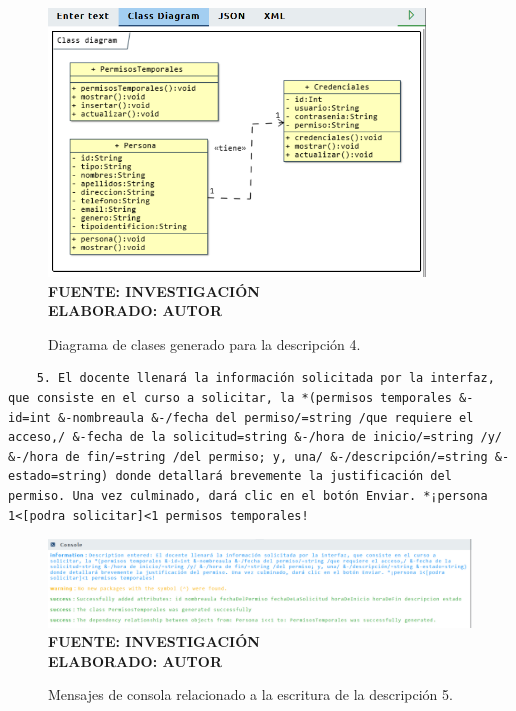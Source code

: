  \begin{figure}[H]
 	\centering
 	\caption{Diagrama de clases generado para la descripción 4.}
 	\includegraphics[width=10cm]{img/dc-eva-004.png}
 	\label{fig:dc_eva_004}
 	\vspace{4mm}
 	{\footnotesize \textbf{\\ FUENTE: INVESTIGACIÓN} \textbf{\\ ELABORADO: AUTOR}}
 \end{figure}
 
 \begin{lstlisting}
 	5. El docente llenará la información solicitada por la interfaz, que consiste en el curso a solicitar, la *(permisos temporales &-id=int &-nombreaula &-/fecha del permiso/=string /que requiere el acceso,/ &-fecha de la solicitud=string &-/hora de inicio/=string /y/ &-/hora de fin/=string /del permiso; y, una/ &-/descripción/=string &-estado=string) donde detallará brevemente la justificación del permiso. Una vez culminado, dará clic en el botón Enviar. *¡persona 1<[podra solicitar]<1 permisos temporales! \end{lstlisting}
 
    \begin{figure}[h!]
    	\centering
 	\caption{Mensajes de consola relacionado a la escritura de la descripción 5.}
 	\includegraphics[width=15cm]{img/not-eva-005.png}
 	\label{fig:not_eva_005}
 	\vspace{4mm}
 	{\footnotesize \textbf{\\ FUENTE: INVESTIGACIÓN} \textbf{\\ ELABORADO: AUTOR}}
 \end{figure}
 
